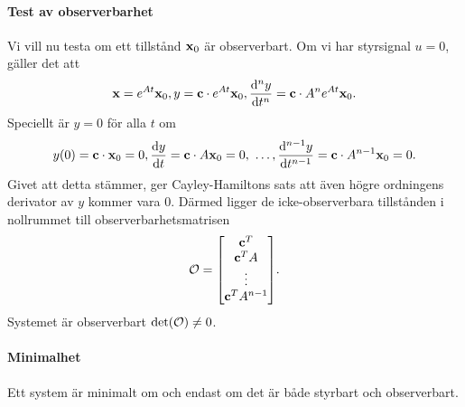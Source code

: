 \paragraph{Test av observerbarhet}
Vi vill nu testa om ett tillstånd $\vb{x}_{0}$ är observerbart. Om vi har styrsignal $u = 0$, gäller det att
\begin{align*}
	\vb{x} = e^{At}\vb{x}_{0}, y = \vb{c}\cdot e^{At}\vb{x}_{0}, \dv[n]{y}{t} = \vb{c}\cdot A^{n}e^{At}\vb{x}_{0}.
\end{align*}
Speciellt är $y = 0$ för alla $t$ om
\begin{align*}
	y(0) = \vb{c}\cdot\vb{x}_{0} = 0, \dv{y}{t} = \vb{c}\cdot A\vb{x}_{0} = 0,\ \dots, \dv[n - 1]{y}{t} = \vb{c}\cdot A^{n - 1}\vb{x}_{0} = 0.
\end{align*}
Givet att detta stämmer, ger Cayley-Hamiltons sats att även högre ordningens derivator av $y$ kommer vara $0$. Därmed ligger de icke-observerbara tillstånden i nollrummet till observerbarhetsmatrisen
\begin{align*}
	\O =
	\mqty[
		\vb{c}^{T} \\
		\vb{c}^{T}A \\
		\vdots \\
		\vb{c}^{T}A^{n - 1}
	].
\end{align*}
Systemet är observerbart $\det(\mathcal{O}) \neq 0$.

\paragraph{Minimalhet}
Ett system är minimalt om och endast om det är både styrbart och observerbart.